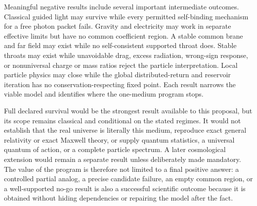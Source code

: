 Meaningful negative results include several important intermediate outcomes.
Classical guided light may survive while every permitted self-binding mechanism
for a free photon packet fails. Gravity and electricity may work in separate
effective limits but have no common coefficient region. A stable common brane
and far field may exist while no self-consistent supported throat does. Stable
throats may exist while unavoidable drag, excess radiation, wrong-sign response,
or nonuniversal charge or mass ratios reject the particle interpretation. Local
particle physics may close while the global distributed-return and reservoir
iteration has no conservation-respecting fixed point. Each result narrows the
viable model and identifies where the one-medium program stops.

Full declared survival would be the strongest result available to this proposal,
but its scope remains classical and conditional on the stated regimes. It would
not establish that the real universe is literally this medium, reproduce exact
general relativity or exact Maxwell theory, or supply quantum statistics, a
universal quantum of action, or a complete particle spectrum. A later
cosmological extension would remain a separate result unless deliberately made
mandatory. The value of the program is therefore not limited to a final positive
answer: a controlled partial analog, a precise candidate failure, an empty
common region, or a well-supported no-go result is also a successful scientific
outcome because it is obtained without hiding dependencies or repairing the
model after the fact.

